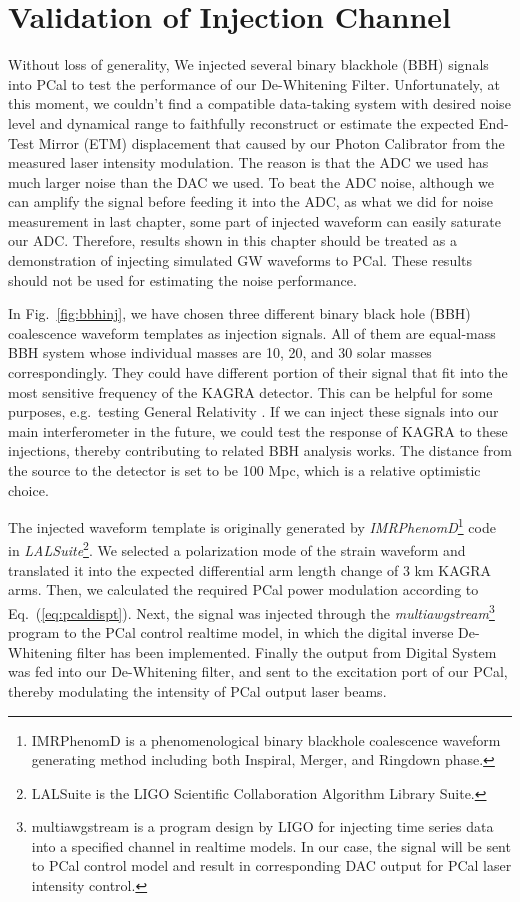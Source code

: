 




\chapter{Validation of Injection Channel}

Without loss of generality, We injected several binary blackhole (BBH) signals into PCal to test the performance of our De-Whitening Filter. Unfortunately, at this moment, we couldn't find a compatible data-taking system with desired noise level and dynamical range to faithfully reconstruct or estimate the expected End-Test Mirror (ETM) displacement that caused by our Photon Calibrator from the measured laser intensity modulation. The reason is that the ADC we used has much larger noise than the DAC we used. To beat the ADC noise, although we can amplify the signal before feeding it into the ADC, as what we did for noise measurement in last chapter, some part of injected waveform can easily saturate our ADC. Therefore, results shown in this chapter should be treated as a demonstration of injecting simulated GW waveforms to PCal. These results should not be used for estimating the noise performance.

In Fig.~\ref{fig:bbhinj}, we have chosen three different binary black hole (BBH) coalescence waveform templates as injection signals. All of them are equal-mass BBH system whose individual masses are 10, 20, and 30 solar masses correspondingly. They could have different portion of their signal that fit into the most sensitive frequency of the KAGRA detector. This can be helpful for some purposes, e.g.~testing General Relativity \cite{ligo:o1bbh}. If we can inject these signals into our main interferometer in the future, we could test the response of KAGRA to these injections, thereby contributing to related BBH analysis works. The distance from the source to the detector is set to be 100 Mpc, which is a relative optimistic choice.

The injected waveform template is originally generated by \emph{IMRPhenomD}\footnote{IMRPhenomD is a phenomenological binary blackhole coalescence waveform generating method including both Inspiral, Merger, and Ringdown phase.} code in \emph{LALSuite}\footnote{LALSuite is the LIGO Scientific Collaboration Algorithm Library Suite.}. We selected a polarization mode of the strain waveform and translated it into the expected differential arm length change of 3 km KAGRA arms. Then, we calculated the required PCal power modulation according to Eq.~(\ref{eq:pcaldispt}). Next, the signal was injected through the \emph{multiawgstream}\footnote{multiawgstream is a program design by LIGO for injecting time series data into a specified channel in realtime models. In our case, the signal will be sent to PCal control model and result in corresponding DAC output for PCal laser intensity control. } program to the PCal control realtime model, in which the digital inverse De-Whitening filter has been implemented. Finally the output from Digital System was fed into our De-Whitening filter, and sent to the excitation port of our PCal, thereby modulating the intensity of PCal output laser beams. 

